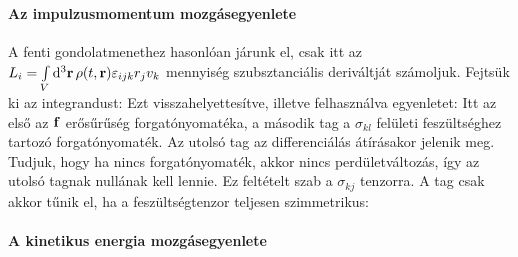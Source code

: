    \paragraph{Az impulzusmomentum mozgásegyenlete}
    
    A fenti gondolatmenethez hasonlóan járunk el, csak itt az $L_i=\int\limits_{V}^{}\mathrm{d}^3\mathbf{r}\,\rho(t,\mathbf{r})\varepsilon_{ijk}r_jv_k$ mennyiség szubsztanciális deriváltját számoljuk.
    Fejtsük ki az integrandust:
    Ezt visszahelyettesítve, illetve felhasználva  egyenletet:
    Itt az első az $\mathbf{f}$ erősűrűség forgatónyomatéka, a második tag a $\sigma_{kl}$ felületi feszültséghez tartozó forgatónyomaték. Az utolsó tag az differenciálás átírásakor jelenik meg. Tudjuk, hogy ha nincs forgatónyomaték, akkor nincs perdületváltozás, így az utolsó tagnak nullának kell lennie. Ez feltételt szab a $\sigma_{kj}$ tenzorra. A tag csak akkor tűnik el, ha a feszültségtenzor teljesen szimmetrikus:
    
    
   \paragraph{A kinetikus energia mozgásegyenlete}
    
